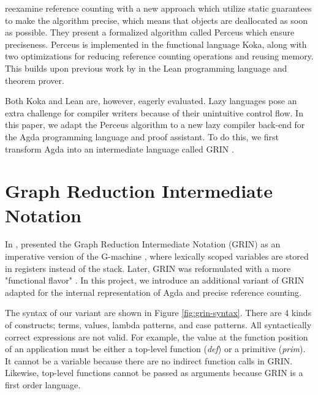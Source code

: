 \documentclass[10pt, twocolumn]{article}
\begin{document}
\citet{reinking2021} reexamine reference counting with a new approach which utilize static guarantees to make the algorithm precise, which means that objects are deallocated as soon as possible.
They present a formalized algorithm called Perceus which ensure preciseness. 
Perceus is implemented in the functional language Koka, along with two optimizations for reducing reference counting operations and reusing memory.
This builds upon previous work by \citet{ullrich2021} in the Lean programming language and theorem prover. 

Both Koka and Lean are, however, eagerly evaluated. 
Lazy languages pose an extra challenge for compiler writers because of their unintuitive control flow. 
In this paper, we adapt the Perceus algorithm to a new lazy compiler back-end for the Agda programming language and proof assistant.
To do this, we first transform Agda into an intermediate language called GRIN \citep{johnsson1991}.

\section{Graph Reduction Intermediate Notation}
In \citeyear{johnsson1991}, \citeauthor{johnsson1991} presented the Graph Reduction Intermediate Notation (GRIN) as an imperative version of the G-machine \citep{johnsson1984}, where lexically scoped variables are stored in registers instead of the stack. 
Later, GRIN was reformulated with a more "functional flavor" \citep{boquist1995}.
In this project, we introduce an additional variant of GRIN adapted for the internal representation of Agda and precise reference counting. 

The syntax of our variant are shown in Figure \ref{fig:grin-syntax}.
There are 4 kinds of constructs; terms, values, lambda patterns, and case patterns.
All syntactically correct expressions are not valid. For example, the value at the function position of an application must be either a top-level function (\emph{def}) or a primitive (\emph{prim}). It cannot be a variable because
there are no indirect function calls in GRIN. Likewise, top-level functions cannot be passed 
as arguments because GRIN is a first order language.
\end{document}
